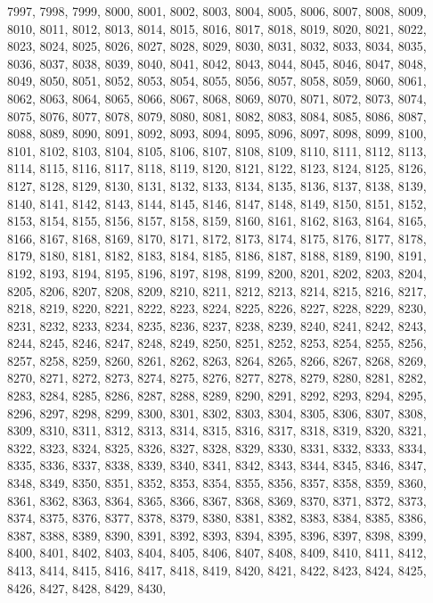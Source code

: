 7997,
7998,
7999,
8000,
8001,
8002,
8003,
8004,
8005,
8006,
8007,
8008,
8009,
8010,
8011,
8012,
8013,
8014,
8015,
8016,
8017,
8018,
8019,
8020,
8021,
8022,
8023,
8024,
8025,
8026,
8027,
8028,
8029,
8030,
8031,
8032,
8033,
8034,
8035,
8036,
8037,
8038,
8039,
8040,
8041,
8042,
8043,
8044,
8045,
8046,
8047,
8048,
8049,
8050,
8051,
8052,
8053,
8054,
8055,
8056,
8057,
8058,
8059,
8060,
8061,
8062,
8063,
8064,
8065,
8066,
8067,
8068,
8069,
8070,
8071,
8072,
8073,
8074,
8075,
8076,
8077,
8078,
8079,
8080,
8081,
8082,
8083,
8084,
8085,
8086,
8087,
8088,
8089,
8090,
8091,
8092,
8093,
8094,
8095,
8096,
8097,
8098,
8099,
8100,
8101,
8102,
8103,
8104,
8105,
8106,
8107,
8108,
8109,
8110,
8111,
8112,
8113,
8114,
8115,
8116,
8117,
8118,
8119,
8120,
8121,
8122,
8123,
8124,
8125,
8126,
8127,
8128,
8129,
8130,
8131,
8132,
8133,
8134,
8135,
8136,
8137,
8138,
8139,
8140,
8141,
8142,
8143,
8144,
8145,
8146,
8147,
8148,
8149,
8150,
8151,
8152,
8153,
8154,
8155,
8156,
8157,
8158,
8159,
8160,
8161,
8162,
8163,
8164,
8165,
8166,
8167,
8168,
8169,
8170,
8171,
8172,
8173,
8174,
8175,
8176,
8177,
8178,
8179,
8180,
8181,
8182,
8183,
8184,
8185,
8186,
8187,
8188,
8189,
8190,
8191,
8192,
8193,
8194,
8195,
8196,
8197,
8198,
8199,
8200,
8201,
8202,
8203,
8204,
8205,
8206,
8207,
8208,
8209,
8210,
8211,
8212,
8213,
8214,
8215,
8216,
8217,
8218,
8219,
8220,
8221,
8222,
8223,
8224,
8225,
8226,
8227,
8228,
8229,
8230,
8231,
8232,
8233,
8234,
8235,
8236,
8237,
8238,
8239,
8240,
8241,
8242,
8243,
8244,
8245,
8246,
8247,
8248,
8249,
8250,
8251,
8252,
8253,
8254,
8255,
8256,
8257,
8258,
8259,
8260,
8261,
8262,
8263,
8264,
8265,
8266,
8267,
8268,
8269,
8270,
8271,
8272,
8273,
8274,
8275,
8276,
8277,
8278,
8279,
8280,
8281,
8282,
8283,
8284,
8285,
8286,
8287,
8288,
8289,
8290,
8291,
8292,
8293,
8294,
8295,
8296,
8297,
8298,
8299,
8300,
8301,
8302,
8303,
8304,
8305,
8306,
8307,
8308,
8309,
8310,
8311,
8312,
8313,
8314,
8315,
8316,
8317,
8318,
8319,
8320,
8321,
8322,
8323,
8324,
8325,
8326,
8327,
8328,
8329,
8330,
8331,
8332,
8333,
8334,
8335,
8336,
8337,
8338,
8339,
8340,
8341,
8342,
8343,
8344,
8345,
8346,
8347,
8348,
8349,
8350,
8351,
8352,
8353,
8354,
8355,
8356,
8357,
8358,
8359,
8360,
8361,
8362,
8363,
8364,
8365,
8366,
8367,
8368,
8369,
8370,
8371,
8372,
8373,
8374,
8375,
8376,
8377,
8378,
8379,
8380,
8381,
8382,
8383,
8384,
8385,
8386,
8387,
8388,
8389,
8390,
8391,
8392,
8393,
8394,
8395,
8396,
8397,
8398,
8399,
8400,
8401,
8402,
8403,
8404,
8405,
8406,
8407,
8408,
8409,
8410,
8411,
8412,
8413,
8414,
8415,
8416,
8417,
8418,
8419,
8420,
8421,
8422,
8423,
8424,
8425,
8426,
8427,
8428,
8429,
8430,
